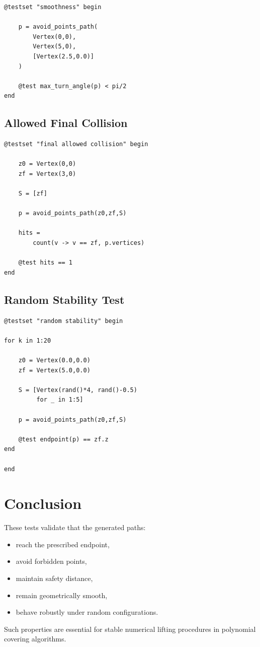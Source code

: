 \documentclass[11pt]{article}
\begin{document}
\begin{lstlisting}
@testset "smoothness" begin

    p = avoid_points_path(
        Vertex(0,0),
        Vertex(5,0),
        [Vertex(2.5,0.0)]
    )

    @test max_turn_angle(p) < pi/2
end
\end{lstlisting}

\subsection{Allowed Final Collision}

\begin{lstlisting}
@testset "final allowed collision" begin

    z0 = Vertex(0,0)
    zf = Vertex(3,0)

    S = [zf]

    p = avoid_points_path(z0,zf,S)

    hits =
        count(v -> v == zf, p.vertices)

    @test hits == 1
end
\end{lstlisting}

\subsection{Random Stability Test}

\begin{lstlisting}
@testset "random stability" begin

for k in 1:20

    z0 = Vertex(0.0,0.0)
    zf = Vertex(5.0,0.0)

    S = [Vertex(rand()*4, rand()-0.5)
         for _ in 1:5]

    p = avoid_points_path(z0,zf,S)

    @test endpoint(p) == zf.z
end

end
\end{lstlisting}

\section{Conclusion}

These tests validate that the generated paths:

\begin{itemize}
\item reach the prescribed endpoint,
\item avoid forbidden points,
\item maintain safety distance,
\item remain geometrically smooth,
\item behave robustly under random configurations.
\end{itemize}

Such properties are essential for stable numerical lifting procedures
in polynomial covering algorithms.
\end{document}
